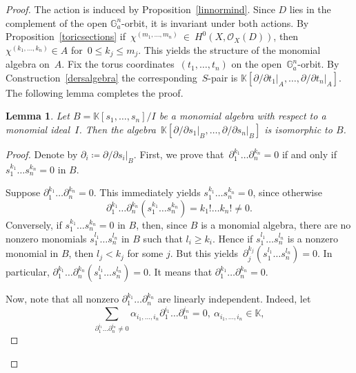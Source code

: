 \documentclass[a4paper,draft,reqno,12pt]{amsart}
\newtheorem{lemma}{Lemma}
\theoremstyle{definition}
\theoremstyle{definition}
\theoremstyle{remark}
\def\BG{{\mathbb G}}
\def\BK{{\mathbb K}}
\def\BG{{\mathbb G}}
\def\BK{{\mathbb K}}
\def\CO{\mathcal{O}}
\begin{document}
\begin{proof}
    The action is induced by Proposition~\ref{linnormind}. Since $D$ lies in the complement of the open $\BG_a^n$-orbit, it is invariant under both actions. By Proposition~\ref{toricsections} if~$\chi^{(m_1,\dotsc,m_n)}~\in~H^0(X, \CO_X(D))$, then~$\chi^{(k_1,\dotsc,k_n)}\in A$ for~$0\leq k_j\leq m_j$. This yields the structure of the monomial algebra on~$A$. Fix the torus coordinates~$(t_1,\dotsc,t_n)$ on the open~$\BG_a^n$-orbit. By Construction~\ref{dersalgebra} the corresponding~$S$-pair is $\BK[\partial/\partial t_1\big|_A,\dotsc,\partial/\partial t_n\big|_A]$. The following lemma completes the proof.

    \begin{lemma}
        Let $B = \BK[s_1,\dotsc,s_n]/I$ be a monomial algebra with respect to a monomial ideal~$I$. Then the algebra~$\BK[\partial/\partial s_1\big|_B,\dotsc,\partial/\partial s_n\big|_B]$ is isomorphic to $B$.
    \end{lemma}

    \begin{proof}
        Denote by $\partial_i\coloneq\partial/\partial s_i|_B$. First, we prove that~$\partial_1^{k_1}\dotsc\partial_n^{k_n}= 0$ if and only if~$s_1^{k_1}\dotsc s_n^{k_n} =0$  in $B$. 

        Suppose $\partial_1^{k_1}\dotsc\partial_n^{k_n} = 0$. This immediately yields $s_1^{k_1}\dotsc s_n^{k_n} = 0$, since otherwise\begin{equation*}
            \partial_1^{k_1}\dotsc\partial_n^{k_n}(s_1^{k_1}\dotsc s_n^{k_n})= k_1!\dotsc k_n!\neq0.
        \end{equation*}
        Conversely, if $s_1^{k_1}\dotsc s_n^{k_n} = 0$ in $B$, then, since $B$ is a monomial algebra, there are no nonzero monomials $s_1^{l_1}\dotsc s_n^{l_n}$ in $B$ such that $l_i\geq k_i$. Hence if $s_1^{l_1}\dotsc s_n^{l_n}$ is a nonzero monomial in $B$, then $l_j<k_j$ for some $j$. But this yields~$\partial_j^{k_j}(s_1^{l_1}\dotsc s_n^{l_n})=0$. In particular, $\partial_1^{k_1}\dotsc\partial_n^{k_n}(s_1^{l_1}\dotsc s_n^{l_n})=0$. It means that $\partial_1^{k_1}\dotsc\partial_n^{k_n} = 0$.

        Now, note that all nonzero $\partial_1^{k_1}\dotsc\partial_n^{k_n}$ are linearly independent. Indeed, let \begin{equation*}          \sum_{\partial_1^{i_1}\dotsc\partial_n^{i_n}\neq0}\alpha_{i_1,\dotsc,i_n}\partial_1^{i_1}\dotsc\partial_n^{i_n}=0, \ \alpha_{i_1,\dotsc,i_n}\in\BK,
        \end{equation*}


\end{proof}
\end{proof}
\end{document}
